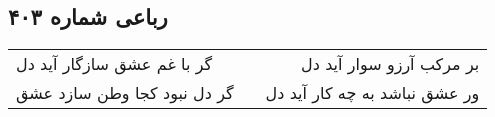 \begin{center}
\section*{رباعی شماره ۴۰۳}
\label{sec:sh403}
\begin{longtable}{l p{0.5cm} r}
گر با غم عشق سازگار آید دل
&&
بر مرکب آرزو سوار آید دل
\\
گر دل نبود کجا وطن سازد عشق
&&
ور عشق نباشد به چه کار آید دل
\\
\end{longtable}
\end{center}
